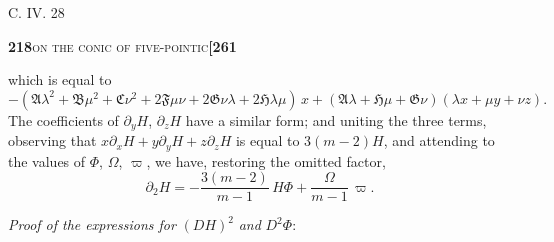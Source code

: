 \documentclass[11pt]{article}
\begin{document}
\hfill C. IV. \hfill 28

\newpage

\noindent\textbf{218}\hfill\textsc{on the conic of five-pointic}\hfill\textbf{[261}

\medskip

\noindent which is equal to
\[
-(\mathfrak{A}\lambda^2 + \mathfrak{B}\mu^2 + \mathfrak{C}\nu^2 + 2\mathfrak{F}\mu\nu + 2\mathfrak{G}\nu\lambda + 2\mathfrak{H}\lambda\mu)\,x
   + (\mathfrak{A}\lambda + \mathfrak{H}\mu + \mathfrak{G}\nu)(\lambda x + \mu y + \nu z).
\]
The coefficients of $\partial_y H$, $\partial_z H$ have a similar form; and uniting the three terms, observing that $x\partial_x H + y\partial_y H + z\partial_z H$ is equal to $3(m-2)H$, and attending to the values of $\Phi$, $\Omega$, $\varpi$, we have, restoring the omitted factor,
\[
\partial_2 H = -\frac{3(m-2)}{m-1}\,H\Phi + \frac{\Omega}{m-1}\,\varpi.
\]

\bigskip

\noindent\textit{Proof of the expressions for} $(DH)^2$ \textit{and} $D^2\Phi$:

\medskip
\end{document}
